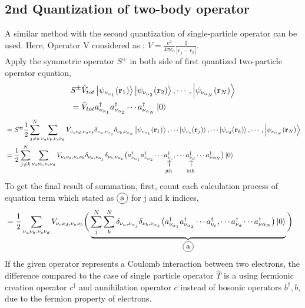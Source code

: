 \documentclass{article}
\makeatletter
\newcommand\vertarrowbox[2]{%
    \begin{array}[t]{@{}c@{}} #1 \\
    \rotatebox{90}{$\xrightarrow{\hphantom{a}}$} \\[-1ex]
    \mathclap{\scriptstyle\text{#2}}%
    \end{array}}
\newcommand\encircle[1]{%
    \tikz[baseline=(X.base)] 
      \node (X) [draw, shape=circle, inner sep=0] {\strut #1};}
\makeatother
\begin{document}
\subsection{2nd Quantization of two-body operator}
A similar method with the second quantization of single-particle operator can be used.  Here, Operator V considered as :  $V=\frac{e^2}{4\pi \epsilon _0} \frac{1}{|r_j-r_k|}$. 
\\
Apply the symmetric operator $S^{\pm}$ in both side of first quantized two-particle operator equation,
\begin{align*}
    &S^{\pm}\hat{V}_{tot}\ket{\psi_{\nu_{\alpha_1}}(\textbf{r}_1)}\ket{\psi_{\nu_{\alpha_2}}(\textbf{r}_2)},\cdots,\ket{\psi_{\nu_{\alpha_N}}(\textbf{r}_N)}\\
    &=\hat{V}_{tot} a^{\dagger}_{\nu_{\alpha_1}}a^{\dagger}_{\nu_{\alpha_2}}\cdots a^{\dagger}_{\nu_{\alpha_N}}\ket{0}
\end{align*}
\begin{align*}
    &=S^{\pm}\frac{1}{2}\sum_{j\neq k}^{N}\sum_{\nu_a\nu_b,\nu_c \nu_d} V_{\nu_c\nu_d,\nu_a \nu_b}\delta_{\nu_a,\nu_{\alpha_j}}\delta_{\nu_b,\nu_{\alpha_k}}\ket{\psi_{\nu_{\alpha_1}}(\textbf{r}_1)},\cdots\ket{\psi_{\nu_{c}}(\textbf{r}_j)}, \cdots\ket{\psi_{\nu_{d}}(\textbf{r}_k)}, \cdots,\ket{\psi_{\nu_{\alpha_N}}(\textbf{r}_N)}\\
    &=\frac{1}{2}\sum_{j\neq k}^{N}\sum_{\nu_a\nu_b,\nu_c \nu_d} V_{\nu_c\nu_d,\nu_a \nu_b}
    \delta_{\nu_a,\nu_{\alpha_j}}\delta_{\nu_b,\nu_{\alpha_k}} \big( a^{\dagger}_{\nu_{\alpha_1}}a^{\dagger}_{\nu_{\alpha_2}}\cdots \vertarrowbox{a^{\dagger}_{\nu_c}}{\text{jth}}, \cdots \vertarrowbox{a^{\dagger}_{\nu_d}}{\text{kth}} \cdots a^{\dagger}_{\nu{\alpha_N}}\big)\ket{0} 
\end{align*}
To get the final result of summation, first, count each calculation process of equation term which stated as $\encircle{a}$ for j and k indices,
\begin{align*}
    &=\frac{1}{2}\sum_{\nu_a\nu_b,\nu_c \nu_d} V_{\nu_c\nu_d,\nu_a \nu_b} \bigg( \underbrace{\sum_{j}^{N}\sum_{k}^{N}
    \delta_{\nu_a,\nu_{\alpha_j}}\delta_{\nu_b,\nu_{\alpha_k}} {\big( a^{\dagger}_{\nu_{\alpha_1}}a^{\dagger}_{\nu_{\alpha_2}}\cdots a^{\dagger}_{\nu_c}, \cdots a^{\dagger}_{\nu_d} \cdots a^{\dagger}_{\nu{\alpha_N}}\big) \ket{0}}}_{\encircle{a}} \bigg)
\end{align*}
If the given operator represents a Coulomb interaction between two electrons, 
the difference compared to the case of single particle operator $\hat{T}$ is a using fermionic creation operator $c^{\dagger}$ and annihilation operator $c$ instead of bosonic operators ${b^{\dagger} , b}$, due to the fermion property of electrons.
\end{document}
